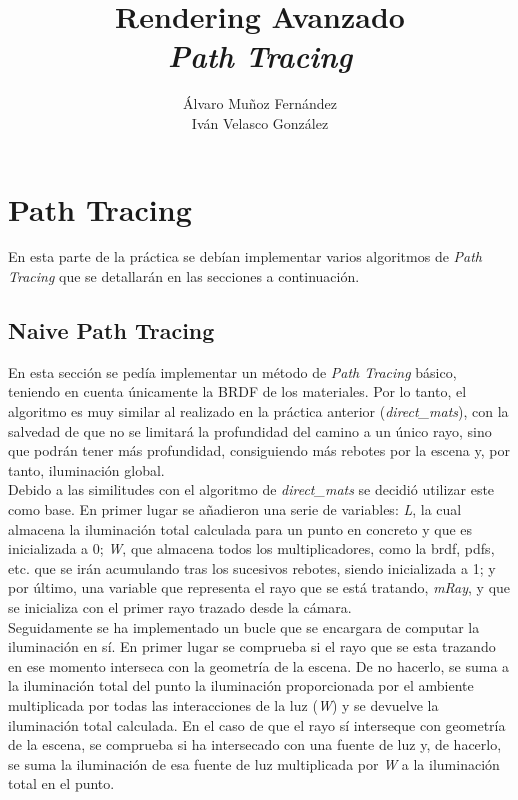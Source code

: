 \documentclass[10pt,oneside,a4paper]{article}
\begin{document}
\begin{titlepage}

\title{\Huge Rendering Avanzado  \\[0.7in] \LARGE \textit{Path Tracing}\\[3.6in]}
\date{}
\author{Álvaro Muñoz Fernández\\
Iván Velasco González}
\maketitle
\thispagestyle{empty}
\end{titlepage}

\section{Path Tracing}
En esta parte de la práctica se debían implementar varios algoritmos de \textit{Path Tracing} que se detallarán en las secciones a continuación.
\subsection{Naive Path Tracing}
En esta sección se pedía implementar un método de \textit{Path Tracing} básico, teniendo en cuenta únicamente la BRDF de los materiales. Por lo tanto, el algoritmo es muy similar al realizado en la práctica anterior (\textit{direct\_mats}), con la salvedad de que no se limitará la profundidad del camino a un único rayo, sino que podrán tener más profundidad, consiguiendo más rebotes por la escena y, por tanto, iluminación global.\\

Debido a las similitudes con el algoritmo de \textit{direct\_mats} se decidió utilizar este como base. En primer lugar se añadieron una serie de variables: \textit{L}, la cual almacena la iluminación total calculada para un punto en concreto y que es inicializada a 0; \textit{W}, que almacena todos los multiplicadores, como la brdf, pdfs, etc. que se irán acumulando tras los sucesivos rebotes, siendo inicializada a 1; y por último, una variable que representa el rayo que se está tratando, \textit{mRay}, y que se inicializa con el primer rayo trazado desde la cámara.\\

Seguidamente se ha implementado un bucle que se encargara de computar la iluminación en sí. En primer lugar se comprueba si el rayo que se esta trazando en ese momento interseca con la geometría de la escena. De no hacerlo, se suma a la iluminación total del punto la iluminación proporcionada por el ambiente multiplicada por todas las interacciones de la luz (\textit{W}) y se devuelve la iluminación total calculada. En el caso de que el rayo sí interseque con geometría de la escena, se comprueba si ha intersecado con una fuente de luz y, de hacerlo, se suma la iluminación de esa fuente de luz multiplicada por \textit{W} a la iluminación total en el punto.\\
\end{document}
